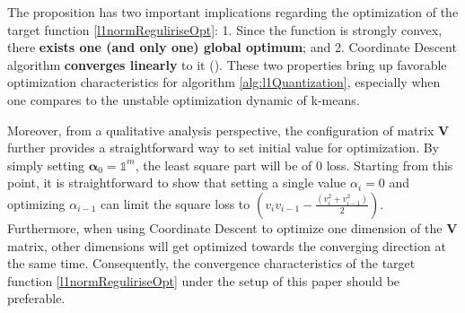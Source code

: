 \documentclass[preprint,10pt]{elsarticle}
\begin{document}
The proposition has two important implications regarding the optimization of the target function \ref{l1normReguliriseOpt}: 1. Since the function is strongly convex, there \textbf{exists one (and only one) global optimum}; and 2. Coordinate Descent algorithm \textbf{converges linearly} to it (\cite{luo1993error,hong2017ConvergenceCoordinate}). These two properties bring up favorable optimization characteristics for algorithm \ref{alg:l1Quantization}, especially when one compares to the unstable optimization dynamic of k-means. \par
Moreover, from a qualitative analysis perspective, the configuration of matrix $\boldsymbol{V}$ further provides a straightforward way to set initial value for optimization. By simply setting $\boldsymbol{\alpha}_{0}=\mathds{1}^{m}$, the least square part will be of $0$ loss. Starting from this point, it is straightforward to show that setting a single value $\alpha_{i}=0$ and optimizing $\alpha_{i-1}$ can limit the square loss to $(v_{i}v_{i-1}-\frac{(v_{i}^{2}+v_{i-1}^{2})}{2})$. Furthermore, when using Coordinate Descent to optimize one dimension of the $\boldsymbol{V}$ matrix, other dimensions will get optimized towards the converging direction at the same time. Consequently, the convergence characteristics of the target function \ref{l1normReguliriseOpt} under the setup of this paper should be preferable.
\end{document}
